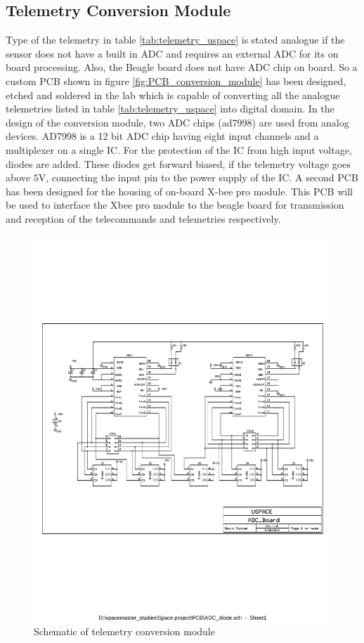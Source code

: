 \subsection{Telemetry Conversion Module}
Type of the telemetry in table \ref{tab:telemetry_uspace} is stated analogue if the sensor does not have a built in \ac{ADC} and requires an external \ac{ADC} for its on board processing. Also, the Beagle board does not have \ac{ADC} chip on board. So a custom \ac{PCB} shown in figure \ref{fig:PCB_conversion_module} has been designed, etched and soldered in the lab which is capable of converting all the analogue telemetries listed in table \ref{tab:telemetry_uspace} into digital domain. In the design of the conversion module, two ADC chips (ad7998) are used from analog devices. AD7998 is a 12 bit \ac{ADC} chip having eight input channels and a multiplexer on a single IC. For the protection of the IC from high input voltage, diodes are added. These diodes get forward biased, if the telemetry voltage goes above $5$V, connecting the input pin to the power supply of the IC.  A second PCB has been designed for the housing of on-board X-bee pro module. This \ac{PCB} will be used to interface the Xbee pro module to 
the beagle board for transmission and reception of the telecommands and telemetries respectively.\\
%
\begin{figure}[bht]
\centering
\includegraphics[scale=0.7]{figures/schematic_conversion_module.pdf}
\caption{Schematic of telemetry conversion module}
\label{fig:schematic_conversion_module}
\end{figure}

